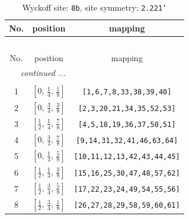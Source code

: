 \documentclass[fleqn,8pt]{jsarticle}
\begin{document}
\begin{longtable}{ccc}
\caption{Wyckoff site: {\tt 8b}, site symmetry: {\tt 2.221'}}
 \\
 \hline \hline
No. & position & mapping \\ \hline \endfirsthead

\multicolumn{2}{l}{\tablename\ \thetable{}} \\
 \hline \hline
No. & position & mapping \\ \hline \endhead

 \hline \hline
\multicolumn{2}{r}{\footnotesize\it continued ...} \\ \endfoot

 \hline \hline
\multicolumn{2}{r}{} \\ \endlastfoot

1 & $\left[ 0,\, \frac{1}{4},\, \frac{1}{8} \right]$ & {\tt [1,6,7,8,33,38,39,40]} \\ \hline
2 & $\left[ 0,\, \frac{3}{4},\, \frac{3}{8} \right]$ & {\tt [2,3,20,21,34,35,52,53]} \\ \hline
3 & $\left[ \frac{1}{2},\, \frac{1}{4},\, \frac{7}{8} \right]$ & {\tt [4,5,18,19,36,37,50,51]} \\ \hline
4 & $\left[ 0,\, \frac{3}{4},\, \frac{7}{8} \right]$ & {\tt [9,14,31,32,41,46,63,64]} \\ \hline
5 & $\left[ 0,\, \frac{1}{4},\, \frac{5}{8} \right]$ & {\tt [10,11,12,13,42,43,44,45]} \\ \hline
6 & $\left[ \frac{1}{2},\, \frac{1}{4},\, \frac{3}{8} \right]$ & {\tt [15,16,25,30,47,48,57,62]} \\ \hline
7 & $\left[ \frac{1}{2},\, \frac{3}{4},\, \frac{5}{8} \right]$ & {\tt [17,22,23,24,49,54,55,56]} \\ \hline
8 & $\left[ \frac{1}{2},\, \frac{3}{4},\, \frac{1}{8} \right]$ & {\tt [26,27,28,29,58,59,60,61]} \\
\end{longtable}
\renewcommand{\arraystretch}{1.2}
\end{document}
